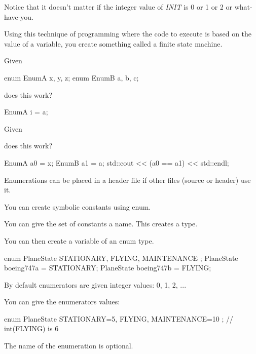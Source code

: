 Notice that it doesn't matter if the integer value of
\textit{INIT} is 0 or 1 or 2 or what-have-you.

Using this technique of programming where the code to execute is based
on the value of a variable, you create something called a finite state
machine.

\begin{ex}
Given

\begin{consolethree}[escapeinside=||]
enum EnumA {x, y, z};
enum EnumB {a, b, c};
\end{consolethree}

does this work?

\begin{consolethree}[escapeinside=||]
EnumA i = a;
\end{consolethree}
\end{ex}

\begin{ex}
Given

\begin{consolethree}[escapeinside=||]
enum EnumA {x, y, z};
enum EnumB (a, b, c};
\end{consolethree}

does this work?

\begin{consolethree}[escapeinside=||]
EnumA a0 = x;
EnumB a1 = a;
std::cout << (a0 == a1) << std::endl;
\end{consolethree}
\end{ex}


\newpage{}

Enumerations can be placed in a header file if other files (source or
header) use it.


\newpage{}

You can create symbolic constants using enum.

You can give the set of constants a name. This creates a type.

You can then create a variable of an enum type.

\begin{consolethree}[escapeinside=||]
enum PlaneState { STATIONARY, FLYING, MAINTENANCE };
PlaneState boeing747a = STATIONARY;
PlaneState boeing747b = FLYING;
\end{consolethree}

By default enumerators are given integer values: 0, 1, 2, ...

You can give the enumerators values:

\begin{consolethree}[escapeinside=||]
enum PlaneState
{
    STATIONARY=5, FLYING, MAINTENANCE=10
}; // int(FLYING) is 6
\end{consolethree}

The name of the enumeration is optional.

